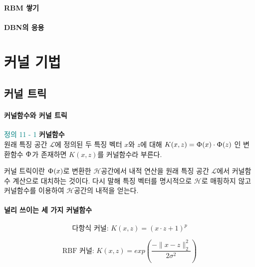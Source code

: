 \documentclass [12pt] {oblivoir}
\begin{document}
\paragraph*{RBM 쌓기}\mbox{}

\vspace{3mm}

\paragraph*{DBN의 응용}\mbox{}

\vspace{3mm}

\newpage
\section{커널 기법}

\subsection{커널 트릭}

\paragraph*{커널함수와 커널 트릭}\mbox{}
\vspace{3mm}

\begin{mdframed}
  \textcolor{teal}{정의 11 - 1} \textbf{커널함수} \\
  원래 특징 공간
  $\mathcal{L}$에 정의된 두 특징 벡터 $x$와 $z$에 대해 $K(x, z) = \Upphi(x) \cdot \Upphi(z)$
  인 변환함수 $\Upphi$가 존재하면 $K(x, z)$를 커널함수라 부른다.
\end{mdframed}

커널 트릭이란 $\Upphi(x)$로 변환한 $\mathcal{H}$공간에서 내적 연산을 원래 특징 공간 $\mathcal{L}$에서 커널함수 계산으로 대치하는 것이다. 다시 말해 특징 벡터를 명시적으로 $\mathcal{H}$로 매핑하지 않고 커널함수를 이용하여 $\mathcal{H}$공간의 내적을 얻는다.

\paragraph*{널리 쓰이는 세 가지 커널함수}\mbox{}

\begin{equation} \tag{11.6}
  \text{다항식 커널: } K(x, z) = (x \cdot z + 1)^{p}
\end{equation}

\begin{equation} \tag{11.7}
  \text{RBF 커널: } K(x, z) = exp\left(\frac{-\lVert x - z \rVert^{2}_{2}}{2 \sigma^{2}}\right)
\end{equation}
\end{document}
